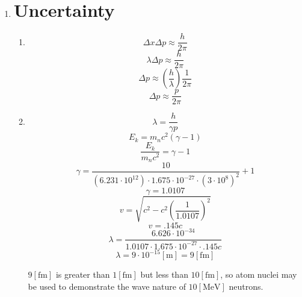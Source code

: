 \begin{enumerate}
\begin{enumerate}
    \end{enumerate}

  \item

    \section*{Uncertainty}

    \begin{enumerate}

      \item 

        $$\Delta x\Delta p \approx \frac{h}{2\pi}$$
        $$\lambda\Delta p \approx \frac{h}{2\pi}$$
        $$\Delta p \approx \left(\frac{h}{\lambda}\right)\frac{1}{2\pi}$$
        $$\boxed{\Delta p \approx \frac{p}{2\pi}}$$

      \item 

        $$\lambda=\frac{h}{\gamma p}$$
        $$E_k=m_nc^2(\gamma-1)$$
        $$\frac{E_k}{m_nc^2}=\gamma-1$$
        $$\gamma=\frac{10}{(6.231\cdot10^{12})\cdot1.675\cdot10^{-27}\cdot\left(3\cdot10^8\right)^2}+1$$
        $$\gamma=1.0107$$
        $$v=\sqrt{c^2-c^2\left( \frac{1}{1.0107} \right)^2}$$
        $$v=.145c$$
        $$\lambda=\frac{6.626\cdot10^{-34}}{1.0107\cdot1.675\cdot10^{-27}\cdot.145c}$$
        $$\boxed{\lambda=9\cdot10^{-15}[\si{\meter}]=9[\si{\femto\meter}]}$$

        $9[\si{\femto\meter}]$ is greater than $1[\si{\femto\meter}]$ but less than $10[\si{\femto\meter}]$, so atom nuclei may be used to demonstrate the wave nature of $10[\si{\mega\eV}]$ neutrons.

    \end{enumerate}

\end{enumerate}



